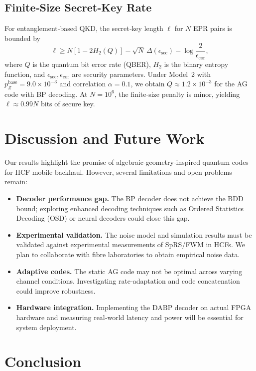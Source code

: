 \documentclass[conference]{IEEEtran}
\begin{document}
\subsection{Finite‑Size Secret‑Key Rate}
For entanglement‑based QKD, the secret‑key length $\ell$ for $N$ EPR pairs is bounded by
\begin{equation}
\ell \ge N[1-2H_2(Q)]-\sqrt{N}\,\Delta(\epsilon_{\mathrm{sec}}) - \log \frac{2}{\epsilon_{\mathrm{cor}}},
\end{equation}
where $Q$ is the quantum bit error rate (QBER), $H_2$ is the binary entropy function, and $\epsilon_{\mathrm{sec}}, \epsilon_{\mathrm{cor}}$ are security parameters.  Under Model 2 with $p_Z^{\mathrm{base}}=9.0\times10^{-3}$ and correlation $\alpha=0.1$, we obtain $Q\approx 1.2\times10^{-3}$ for the AG code with BP decoding.  At $N=10^6$, the finite‑size penalty is minor, yielding $\ell\approx 0.99N$ bits of secure key.

\section{Discussion and Future Work}

Our results highlight the promise of algebraic‑geometry‑inspired quantum codes for HCF mobile backhaul.  However, several limitations and open problems remain:

\begin{itemize}[leftmargin=*]
  \item \textbf{Decoder performance gap.}  The BP decoder does not achieve the BDD bound; exploring enhanced decoding techniques such as Ordered Statistics Decoding (OSD) or neural decoders could close this gap.
  \item \textbf{Experimental validation.}  The noise model and simulation results must be validated against experimental measurements of SpRS/FWM in HCFs.  We plan to collaborate with fibre laboratories to obtain empirical noise data.
  \item \textbf{Adaptive codes.}  The static AG code may not be optimal across varying channel conditions.  Investigating rate‑adaptation and code concatenation could improve robustness.
  \item \textbf{Hardware integration.}  Implementing the DABP decoder on actual FPGA hardware and measuring real‑world latency and power will be essential for system deployment.
\end{itemize}

\section{Conclusion}
\end{document}
